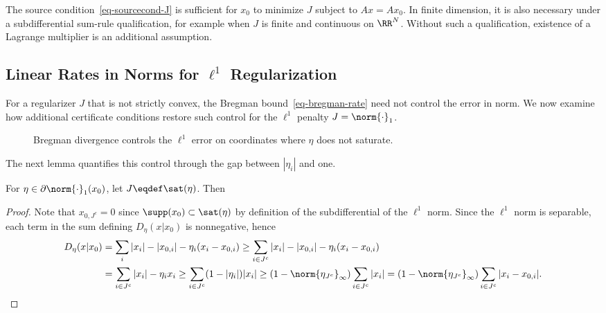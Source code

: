 %
The source condition~\eqref{eq-sourcecond-J} is sufficient for $x_0$ to minimize $J$ subject to $Ax=Ax_0$. In finite dimension, it is also necessary under a subdifferential sum-rule qualification, for example when $J$ is finite and continuous on $\RR^N$. Without such a qualification, existence of a Lagrange multiplier is an additional assumption.

\subsection{Linear Rates in Norms for \texorpdfstring{$\ell^1$}{l1} Regularization}

For a regularizer $J$ that is not strictly convex, the Bregman bound~\eqref{eq-bregman-rate} need not control the error in norm. We now examine how additional certificate conditions restore such control for the $\ell^1$ penalty $J=\norm{\cdot}_1$.

    \begin{figure}[tbp]
\centering
{}
\caption{Bregman divergence controls the $\ell^1$ error on coordinates where $\eta$ does not saturate.}
\label{fig-review-sparse-theory-bregman-l1}
\end{figure}
	
The next lemma quantifies this control through the gap between $|\eta_i|$ and one.

\begin{lem}
	For $\eta \in \partial \norm{\cdot}_1(x_0)$, let $J \eqdef \sat(\eta)$. Then
\end{lem}

\begin{proof}
Note that $x_{0,J^c}=0$ since $\supp(x_0) \subset \sat(\eta)$ by definition of the subdifferential of the $\ell^1$ norm.
%
	Since the $\ell^1$ norm is separable, each term in the sum defining $D_\eta(x|x_0)$ is nonnegative, hence
	\begin{align*}
		D_\eta(x|x_0) &= \sum_i |x_i|-|x_{0,i}|- \eta_i ( x_{i}-x_{0,i} ) 
			\geq \sum_{i \in J^c} |x_i|-|x_{0,i}|- \eta_i ( x_{i}-x_{0,i} ) \\
		&= \sum_{i \in J^c} |x_i|- \eta_i x_{i} \geq \sum_{i \in J^c} (1-|\eta_i|) |x_i|
		\geq (1-\norm{\eta_{J^c}}_\infty) \sum_{i \in J^c} |x_i|
		= (1-\norm{\eta_{J^c}}_\infty) \sum_{i \in J^c} |x_i-x_{0,i}|.
	\end{align*}
\end{proof}

